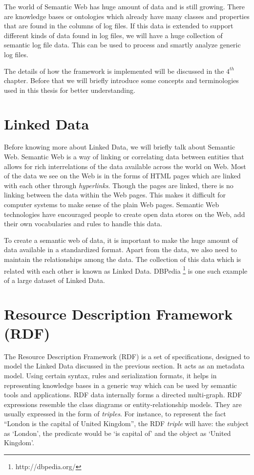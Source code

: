 The world of Semantic Web has huge amount of data and is still growing. There are knowledge bases or ontologies which already have many classes and properties that are found in the columns of log files. If this data is extended to support different kinds of data found in log files, we will have a huge collection of semantic log file data. This can be used to process and smartly analyze generic log files.

The details of how the framework is implemented will be discussed in the $4^{th}$ chapter. Before that we will briefly introduce some concepts and terminologies used in this thesis for better understanding.

\section{Linked Data}

Before knowing more about Linked Data, we will briefly talk about Semantic Web. Semantic Web is a way of linking or correlating data between entities that allows for rich interrelations of the data available across the world on Web. Most of the data we see on the Web is in the forms of HTML pages which are linked with each other through \textit{hyperlinks}. Though the pages are linked, there is no linking between the data within the Web pages. This makes it difficult for computer systems to make sense of the plain Web pages. Semantic Web technologies have encouraged people to create open data stores on the Web, add their own vocabularies and rules to handle this data.

To create a semantic web of data, it is important to make the huge amount of data available in a standardized format. Apart from the data, we also need to maintain the relationships among the data. The collection of this data which is related with each other is known as Linked Data. DBPedia \footnote{http://dbpedia.org/} is one such example of a large dataset of Linked Data.

\section{Resource Description Framework (RDF)}

The Resource Description Framework (RDF) is a set of specifications, designed to model the Linked Data discussed in the previous section. It acts as an metadata model. Using certain syntax, rules and serialization formats, it helps in representing knowledge bases in a generic way which can be used by semantic tools and applications. RDF data internally forms a directed multi-graph. RDF expressions resemble the class diagrams or entity-relationship models. They are usually expressed in the form of \textit{triples}. For instance, to represent the fact ``London is the capital of United Kingdom'', the RDF \textit{triple} will have: the subject as `London', the predicate would be `is capital of' and the object as `United Kingdom'.

